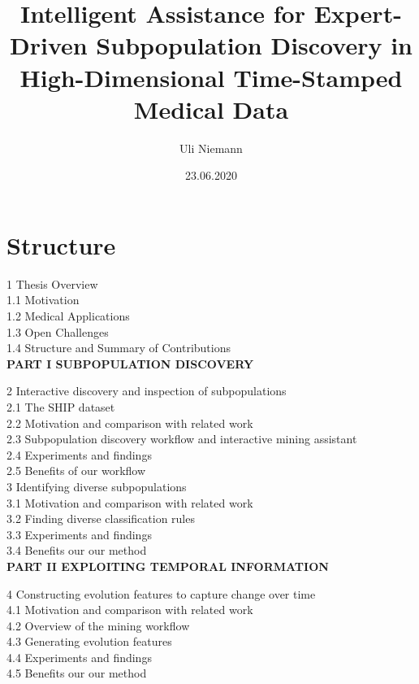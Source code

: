 \documentclass[
]{book}
\title{Intelligent Assistance for Expert-Driven Subpopulation Discovery in High-Dimensional Time-Stamped Medical Data}
\author{Uli Niemann}
\date{23.06.2020}
\begin{document}
\maketitle

{
\setcounter{tocdepth}{1}
\tableofcontents
}
\hypertarget{structure}{%
\section*{Structure}\label{structure}}

1 Thesis Overview\\
1.1 Motivation\\
1.2 Medical Applications\\
1.3 Open Challenges\\
1.4 Structure and Summary of Contributions\\

\textbf{PART I SUBPOPULATION DISCOVERY}

2 Interactive discovery and inspection of subpopulations\\
2.1 The SHIP dataset\\
2.2 Motivation and comparison with related work\\
2.3 Subpopulation discovery workflow and interactive mining assistant\\
2.4 Experiments and findings\\
2.5 Benefits of our workflow\\

3 Identifying diverse subpopulations\\
3.1 Motivation and comparison with related work\\
3.2 Finding diverse classification rules\\
3.3 Experiments and findings\\
3.4 Benefits our our method\\

\textbf{PART II EXPLOITING TEMPORAL INFORMATION}

4 Constructing evolution features to capture change over time\\
4.1 Motivation and comparison with related work\\
4.2 Overview of the mining workflow\\
4.3 Generating evolution features\\
4.4 Experiments and findings\\
4.5 Benefits our our method\\
\end{document}
